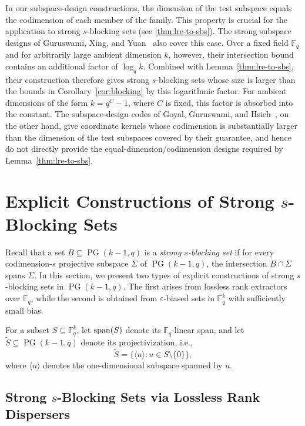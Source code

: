\documentclass[11pt]{article}
\newcommand{\eps}{\varepsilon}
\newcommand{\F}{\mathbb{F}}
\DeclareMathOperator{\PG}{PG}
\begin{document}
\begin{remark} 
In our subspace-design constructions, the dimension of the test subspace equals the codimension of each member of the family. 
This property is crucial for the application to strong $s$-blocking sets (see \cref{thm:lre-to-sbs}).
The strong subspace designs of Guruswami, Xing, and Yuan~\cite{guruswami2018subspace} also cover this case. Over a fixed field $\F_q$ and for arbitrarily large ambient dimension $k$, however, their intersection bound contains an additional factor of $\log_q k$. Combined with Lemma~\ref{thm:lre-to-sbs}, their construction therefore gives strong $s$-blocking sets whose size is larger than the bounds in Corollary~\ref{cor:blocking} by this logarithmic factor. For ambient dimensions of the form $k=q^C-1$, where $C$ is fixed, this factor is absorbed into the constant. The subspace-design codes of Goyal, Guruswami, and Hsieh~\cite{GGH26}, on the other hand, give coordinate kernels whose codimension is substantially larger than the dimension of the test subspaces covered by their guarantee, and hence do not directly provide the equal-dimension/codimension designs required by Lemma~\ref{thm:lre-to-sbs}.
\end{remark}

\section{Explicit Constructions of Strong $s$-Blocking Sets}\label{sec:explicit-sbb}

Recall that a set $B \subseteq \PG(k-1,q)$ is a \emph{strong $s$-blocking set} if for every codimension-$s$ projective subspace $\Sigma$ of $\PG(k-1,q)$, the intersection $B \cap \Sigma$ spans $\Sigma$.
In this section, we present two types of explicit constructions of strong $s$-blocking sets in $\PG(k-1,q)$. The first arises from lossless rank extractors over $\F_q$, while the second is obtained from $\eps$-biased sets in $\F_q^k$ with sufficiently small bias. 

For a subset $S\subseteq \F_q^k$, let ${\rm span}(S)$ denote its $\F_q$-linear span, and let $\widetilde{S}\subseteq \PG(k-1,q)$ denote its projectivization, i.e., 
\[
\widetilde{S}=\{\langle u\rangle : u\in S\setminus\{0\}\},
\]
where $\langle u\rangle$ denotes the one-dimensional subspace spanned by $u$.

\subsection{Strong $s$-Blocking Sets via Lossless Rank Dispersers}
\end{document}
